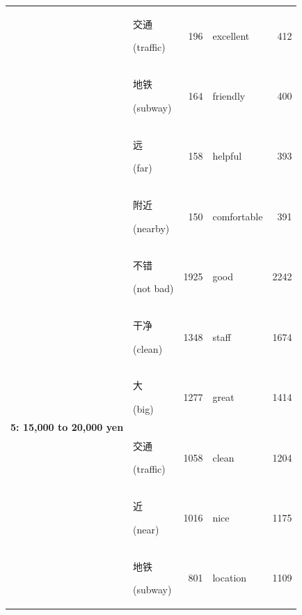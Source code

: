 \documentclass[smallextended,natbib]{svjour3}       %
\begin{document}
\begin{table}[ht]
{\begin{tabular}{|c|lr|lr|}
                                                             & \begin{CJK}{UTF8}{gbsn}交通\end{CJK} (traffic)         & 196   & excellent   & 412   \\  
                                                             & \begin{CJK}{UTF8}{gbsn}地铁\end{CJK} (subway)          & 164   & friendly    & 400   \\  
                                                             & \begin{CJK}{UTF8}{gbsn}远\end{CJK} (far)              & 158   & helpful     & 393   \\  
                                                             & \begin{CJK}{UTF8}{gbsn}附近\end{CJK} (nearby)          & 150   & comfortable & 391   \\ \hline
        \multirow{10}{*}{\textbf{5: 15,000 to 20,000 yen}}   & \begin{CJK}{UTF8}{gbsn}不错\end{CJK} (not bad)         & 1925  & good        & 2242  \\  
                                                             & \begin{CJK}{UTF8}{gbsn}干净\end{CJK} (clean)           & 1348  & staff       & 1674  \\  
                                                             & \begin{CJK}{UTF8}{gbsn}大\end{CJK} (big)              & 1277  & great       & 1414  \\  
                                                             & \begin{CJK}{UTF8}{gbsn}交通\end{CJK} (traffic)         & 1058  & clean       & 1204  \\  
                                                             & \begin{CJK}{UTF8}{gbsn}近\end{CJK} (near)             & 1016  & nice        & 1175  \\  
                                                             & \begin{CJK}{UTF8}{gbsn}地铁\end{CJK} (subway)          & 801   & location    & 1109  \\  

\end{tabular}}
\end{table}
\end{document}
